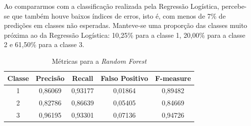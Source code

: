 Ao compararmos com a classificação realizada pela Regressão Logística, percebe-se que também houve baixos índices de erros, isto é, com menos de 7\% de predições em classes não esperadas. Manteve-se uma proporção das classes muito próxima ao da Regressão Logística: 10,25\% para a classe 1, 20,00\% para a classe 2 e 61,50\% para a classe 3.



\begin{table}[!ht]
  \caption{Métricas para a \emph{Random Forest}}
  \centering
  \begin{tabular}{ c c c c c } \toprule
  Classe & Precisão & Recall  & Falso Positivo & F-measure  \\\midrule
        1    & 0,86069  & 0,93177 & 0,01864        & 0,89482    \\
    2    & 0,82786  & 0,86639 & 0,05405        & 0,84669    \\
    3    & 0,96195  & 0,93301 & 0,07136        & 0,94726 \\\bottomrule
\end{tabular}
\end{table}








